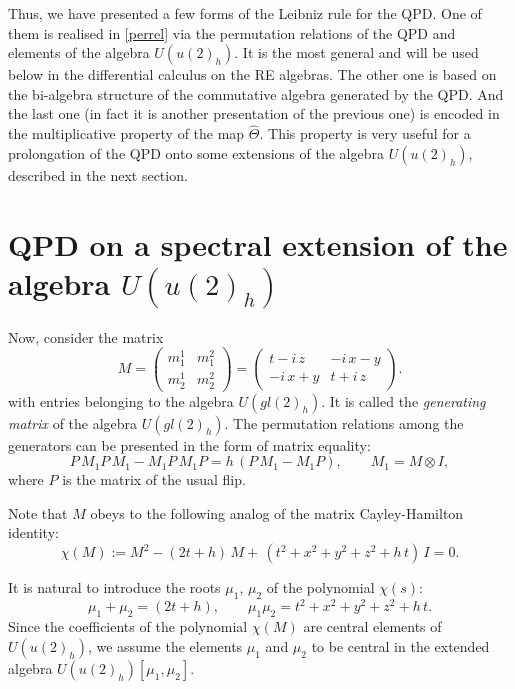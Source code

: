 \documentclass[11pt]{article}
\newcommand{\ot}{\otimes}
\newcommand{\hatt}{\widehat{\Theta}}
\numberwithin{equation}{section}
\theoremstyle{plain}
\theoremstyle{definition}
\begin{document}
Thus, we have presented a few forms of the Leibniz rule for the QPD. One of them is realised in \eqref{perrel} via the permutation relations of
the QPD and elements of the algebra $U(u(2)_h)$. It is the most general and will be used below in the differential calculus on the RE algebras. 
The other one is based on the bi-algebra structure of the commutative algebra generated by the QPD. And the last one (in fact it is another presentation of the previous one) 
is encoded in the multiplicative property of the map $\hatt$. This
property is very useful for a prolongation of the QPD onto some extensions of the algebra $U(u(2)_h)$, described in the next section.

\section[QPD on a spectral extension of U(u(2)h)]{QPD on a spectral extension of the algebra $U(u(2)_h)$}\label{sec:spectral}

Now, consider the matrix
\begin{equation}
M=\left(\begin{array}{cc}
	m_1^1& m_1^2\\
	m_2^1& m_2^2
\end{array}\right)=\left(\begin{array}{cc}
	t-i\,z& -i\, x-y\\
	-i\, x+y& t+i\, z
\end{array}\right).
\label{matrN}
\end{equation}
with entries belonging to the algebra $U(gl(2)_h)$. It is called the \emph{generating matrix} of the algebra $U(gl(2)_h)$.
The permutation relations among the generators can be presented in the form of matrix equality:
\[
P\,M_1P\,M_1-M_1P\,M_1P=h\,(P\, M_1-M_1 P), \qquad M_1=M\ot I,
\]
where $P$ is the matrix of the usual flip.

Note that $M$ obeys to the following analog of the matrix Cayley-Hamilton identity:
\begin{equation}
\chi(M) := M^2-(2t+h)\, M+\,(t^2+x^2+y^2+z^2+h\, t)\,I= 0.
\label{CH}
\end{equation}

It is natural to introduce the roots $\mu_1,\, \mu_2$ of the polynomial $\chi(s)$:
\[
\mu_1+\mu_2=(2t+h),\qquad \mu_1 \mu_2=t^2+x^2+y^2+z^2+h\, t.
\]
Since the coefficients of the polynomial $\chi(M)$ are central elements of $U(u(2)_h)$, we assume the elements $\mu_1$ and
$\mu_2$ to be central in the extended algebra $U(u(2)_h)[\mu_1,\mu_2]$.
\end{document}
